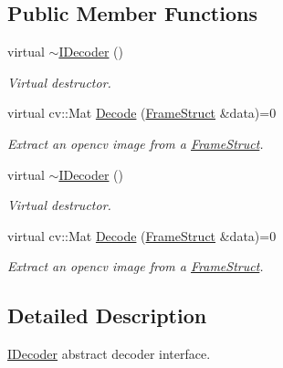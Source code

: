 \subsection*{Public Member Functions}
\begin{DoxyCompactItemize}
\item 
\mbox{\label{classmoetsi_1_1ssp_1_1IDecoder_a26dc991c2434792f50ec5ae9b61a1653}} 
virtual \hyperlink{classmoetsi_1_1ssp_1_1IDecoder_a26dc991c2434792f50ec5ae9b61a1653}{$\sim$\+I\+Decoder} ()
\begin{DoxyCompactList}\small\item\em Virtual destructor. \end{DoxyCompactList}\item 
virtual cv\+::\+Mat \hyperlink{classmoetsi_1_1ssp_1_1IDecoder_a1c06604dc4107d3668a4e791c13cc063}{Decode} (\hyperlink{structmoetsi_1_1ssp_1_1FrameStruct}{Frame\+Struct} \&data)=0
\begin{DoxyCompactList}\small\item\em Extract an opencv image from a \hyperlink{structmoetsi_1_1ssp_1_1FrameStruct}{Frame\+Struct}. \end{DoxyCompactList}\item 
\mbox{\label{classmoetsi_1_1ssp_1_1IDecoder_a26dc991c2434792f50ec5ae9b61a1653}} 
virtual \hyperlink{classmoetsi_1_1ssp_1_1IDecoder_a26dc991c2434792f50ec5ae9b61a1653}{$\sim$\+I\+Decoder} ()
\begin{DoxyCompactList}\small\item\em Virtual destructor. \end{DoxyCompactList}\item 
virtual cv\+::\+Mat \hyperlink{classmoetsi_1_1ssp_1_1IDecoder_a1c06604dc4107d3668a4e791c13cc063}{Decode} (\hyperlink{structmoetsi_1_1ssp_1_1FrameStruct}{Frame\+Struct} \&data)=0
\begin{DoxyCompactList}\small\item\em Extract an opencv image from a \hyperlink{structmoetsi_1_1ssp_1_1FrameStruct}{Frame\+Struct}. \end{DoxyCompactList}\end{DoxyCompactItemize}


\subsection{Detailed Description}
\hyperlink{classmoetsi_1_1ssp_1_1IDecoder}{I\+Decoder} abstract decoder interface. 

